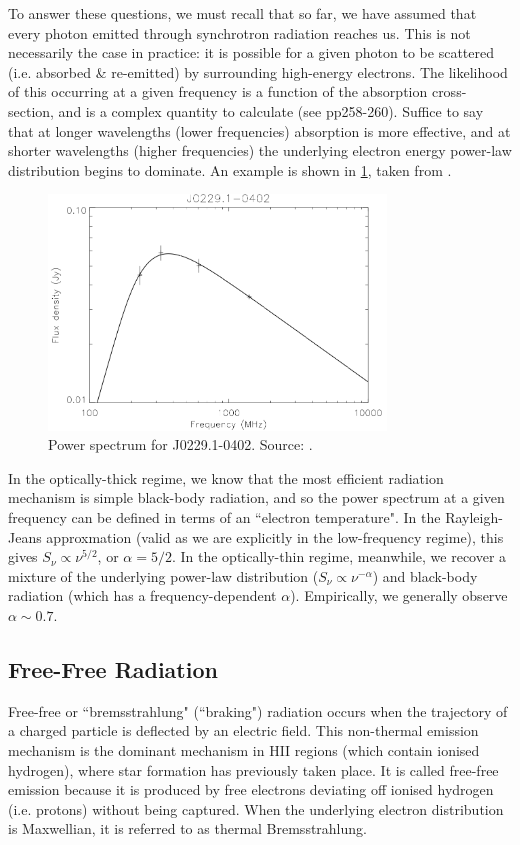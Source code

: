 \pg
To answer these questions, we must recall that so far, we have assumed that every photon emitted through synchrotron radiation reaches us. This is not necessarily the case in practice: it is possible for a given photon to be scattered (i.e. absorbed \& re-emitted) by surrounding high-energy electrons. The likelihood of this occurring at a given frequency is a function of the absorption cross-section, and is a complex quantity to calculate (see  pp258-260). Suffice to say that at longer wavelengths (lower frequencies) absorption is more effective, and at shorter wavelengths (higher frequencies) the underlying electron energy power-law  distribution begins to dominate. An example is shown in \cref{fig.synchrotron}, taken from .

\begin{figure}[!h]
\centering
\includegraphics[width=0.8\textwidth]{images/synchrotron-spectrum.png}
\caption{\label{fig.synchrotron} Power spectrum for J0229.1-0402. Source: .}
\end{figure}

\pg
In the optically-thick regime, we know that the most efficient radiation mechanism is simple black-body radiation, and so the power spectrum at a given frequency can be defined in terms of an ``electron temperature". In the Rayleigh-Jeans approxmation (valid as we are explicitly in the low-frequency regime), this gives $S_\nu \propto \nu^{5/2}$, or $\alpha=5/2$. 
In the optically-thin regime, meanwhile, we recover a mixture of the underlying power-law distribution ($S_\nu \propto \nu^{-\alpha}$) and black-body radiation (which has a frequency-dependent $\alpha$). Empirically, we generally observe $\alpha \sim 0.7$.


\subsection{Free-Free Radiation}
\pg
Free-free or ``bremsstrahlung" (``braking") radiation occurs when the trajectory of a charged particle is deflected by an electric field. This non-thermal emission mechanism is the dominant mechanism in HII regions (which contain ionised hydrogen), where star formation has previously taken place. It is called free-free emission because it is produced by free electrons deviating off ionised hydrogen (i.e. protons) without being captured. When the underlying electron distribution is Maxwellian, it is referred to as thermal Bremsstrahlung.


